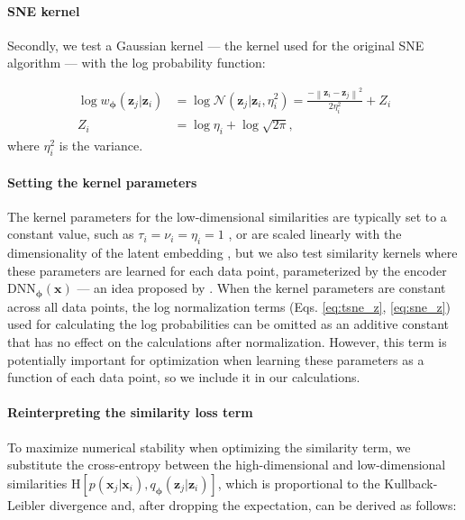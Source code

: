 \paragraph{SNE kernel} Secondly, we test a Gaussian kernel --- the kernel used for the original SNE algorithm \citep{hinton2003stochastic, maaten2008tsne} --- with the log probability function:

\begin{subequations}
    \begin{align}
        \log w_{\boldsymbol{\phi}}(\mathbf{z}_j | \mathbf{z}_i) &= \log \mathcal{N}(\mathbf{z}_j | \mathbf{z}_i, \eta_i^{2}) = \frac{-\left\|\mathbf{z}_{i} - \mathbf{z}_{j} \right\|^{2}}{2 \eta_i^{2}} + Z_i \label{eq:sne_logp}\\
        Z_i &= \log\eta_i + \log\sqrt{2 \pi} \label{eq:sne_z},
    \end{align}
\end{subequations}
where $\eta_i^2$ is the variance. 

\paragraph{Setting the kernel parameters} The kernel parameters for the low-dimensional similarities are typically set to a constant value, such as $\tau_i = \nu_i = \eta_i = 1$ \citep{maaten2008tsne}, or are scaled linearly with the dimensionality of the latent embedding \citep{van2009ptsne}, but we also test similarity kernels where these parameters are learned for each data point, parameterized by the encoder $\mathrm{DNN}_{\boldsymbol{\phi}}(\mathbf{x})$ --- an idea proposed by \cite{van2009ptsne}. When the kernel parameters are constant across all data points, the log normalization terms (Eqs. \ref{eq:tsne_z}, \ref{eq:sne_z}) used for calculating the log probabilities can be omitted as an additive constant that has no effect on the calculations after normalization. However, this term is potentially important for optimization when learning these parameters as a function of each data point, so we include it in our calculations.

\paragraph{Reinterpreting the similarity loss term} To maximize numerical stability when optimizing the similarity term, we substitute the cross-entropy between the high-dimensional and low-dimensional similarities $\mathrm{H}[p(\mathbf{x}_j | \mathbf{x}_i), q_{\boldsymbol{\phi}}(\mathbf{z}_j | \mathbf{z}_i)]$, which is proportional to the Kullback-Leibler divergence and, after dropping the expectation, can be derived as follows:

